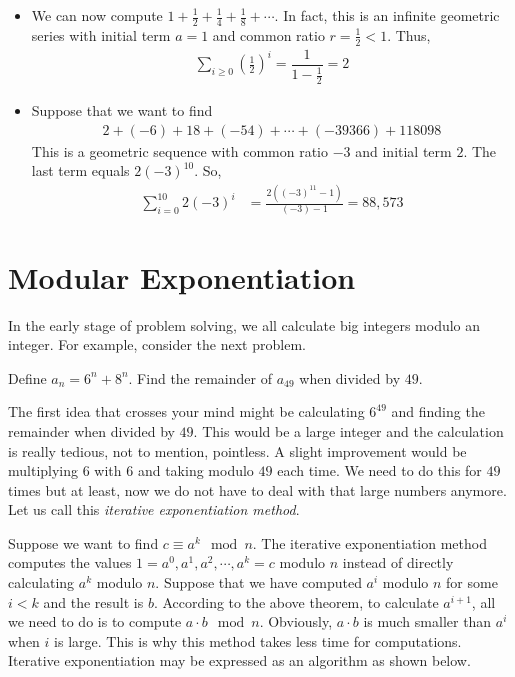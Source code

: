 \documentclass{subfile}
\begin{document}
		\begin{example}
		$ $
			\begin{itemize}
				\item We can now compute $1 + \frac{1}{2}+ \frac{1}{4}+\frac{1}{8}+ \cdots$. In fact, this is an infinite geometric series with initial term $a=1$ and common ratio $r=\frac{1}{2}<1$. Thus,
					\begin{align*}
						\sum_{i\geq0} \left(\frac{1}{2}\right)^i = \dfrac{1}{1-\frac{1}{2}} = 2
					\end{align*}
				\item Suppose that we want to find
					\begin{align*}
						2 + (-6) + 18 + (-54) + \cdots + (-39366) + 118098
					\end{align*}
				This is a geometric sequence with common ratio $-3$ and initial term $2$. The last term equals $2(-3)^{10}$. So,
					\begin{align*}
						\sum_{i=0}^{10} 2(-3)^{i}
							& = \frac{2 \left((-3)^{11} -1\right)}{(-3) - 1} = 88,573
					\end{align*}
			\end{itemize}
		\end{example}
	\section{Modular Exponentiation} \label{modexponent}
	In the early stage of problem solving, we all calculate big integers modulo an integer. For example, consider the next problem.
		\begin{problem}
			Define $a_n=6^n+8^n$. Find the remainder of $a_{49}$ when divided by $49$.
		\end{problem}
	The first idea that crosses your mind might be calculating $6^{49}$ and finding the remainder when divided by $49$. This would be a large integer and the calculation is really tedious, not to mention, pointless. A slight improvement would be multiplying $6$ with $6$ and taking modulo $49$ each time. We need to do this for $49$ times but at least, now we do not have to deal with that large numbers anymore. Let us call this \textit{iterative exponentiation method}.

	Suppose we want to find $c \equiv a^k \mod n$. The iterative exponentiation method computes the values $1=a^0, a^1, a^2, \cdots, a^k=c$ modulo $n$ instead of directly calculating $a^k$ modulo $n$. Suppose that we have computed $a^i$ modulo $n$ for some $i<k$ and the result is $b$. According to the above theorem, to calculate $a^{i+1}$, all we need to do is to compute $a\cdot b \mod n$. Obviously, $a \cdot b$ is much smaller than $a^i$ when $i$ is large. This is why this method takes less time for computations. Iterative exponentiation may be expressed as an algorithm as shown below.
\end{document}
